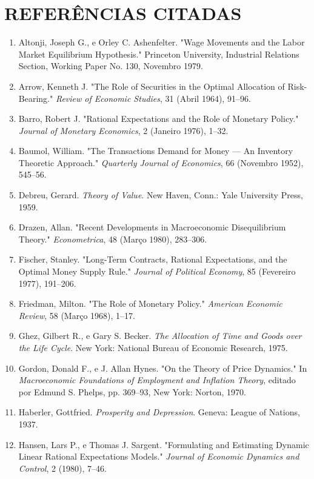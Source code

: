 \documentclass[12pt]{article}
\begin{document}
\section*{REFERÊNCIAS CITADAS}

\begin{enumerate}
    \item Altonji, Joseph G., e Orley C. Ashenfelter. "Wage Movements and the Labor Market Equilibrium Hypothesis." Princeton University, Industrial Relations Section, Working Paper No. 130, Novembro 1979.
    \item Arrow, Kenneth J. "The Role of Securities in the Optimal Allocation of Risk-Bearing." \textit{Review of Economic Studies}, 31 (Abril 1964), 91--96.
    \item Barro, Robert J. "Rational Expectations and the Role of Monetary Policy." \textit{Journal of Monetary Economics}, 2 (Janeiro 1976), 1--32.
    \item Baumol, William. "The Transactions Demand for Money --- An Inventory Theoretic Approach." \textit{Quarterly Journal of Economics}, 66 (Novembro 1952), 545--56.
    \item Debreu, Gerard. \textit{Theory of Value}. New Haven, Conn.: Yale University Press, 1959.
    \item Drazen, Allan. "Recent Developments in Macroeconomic Disequilibrium Theory." \textit{Econometrica}, 48 (Março 1980), 283--306.
    \item Fischer, Stanley. "Long-Term Contracts, Rational Expectations, and the Optimal Money Supply Rule." \textit{Journal of Political Economy}, 85 (Fevereiro 1977), 191--206.
    \item Friedman, Milton. "The Role of Monetary Policy." \textit{American Economic Review}, 58 (Março 1968), 1--17.
    \item Ghez, Gilbert R., e Gary S. Becker. \textit{The Allocation of Time and Goods over the Life Cycle}. New York: National Bureau of Economic Research, 1975.
    \item Gordon, Donald F., e J. Allan Hynes. "On the Theory of Price Dynamics." In \textit{Macroeconomic Foundations of Employment and Inflation Theory}, editado por Edmund S. Phelps, pp. 369--93, New York: Norton, 1970.
    \item Haberler, Gottfried. \textit{Prosperity and Depression}. Geneva: League of Nations, 1937.
    \item Hansen, Lars P., e Thomas J. Sargent. "Formulating and Estimating Dynamic Linear Rational Expectations Models." \textit{Journal of Economic Dynamics and Control}, 2 (1980), 7--46.

\end{enumerate}
\end{document}
